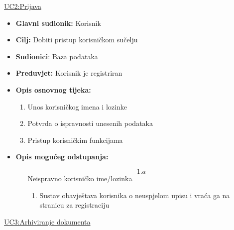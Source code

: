 \documentclass{article} %
\begin{document}
\noindent\underline{UC2:Prijava}

\begin{itemize}
	\item \textbf{Glavni sudionik:} Korisnik
	
	
	\item \textbf{Cilj:} Dobiti pristup korisničkom sučelju
	
	
	\item \textbf{Sudionici}: Baza podataka
	
	\item \textbf{Preduvjet:} Korisnik je registriran
	
	
	\item \textbf{Opis osnovnog tijeka:} 
	\begin{enumerate}
		\item Unos korisničkog imena i lozinke
		
		
		\item Potvrda o ispravnosti unesenih podataka
		
		
		\item Pristup korisničkim funkcijama
		
	\end{enumerate}
	\item \textbf{Opis mogućeg odstupanja:}
	
	\begin{enumerate}
		\item[$$1.a$$] Neispravno korisničko ime/lozinka
		
		\begin{enumerate}[label=\arabic*.]
			\item Sustav obavještava korisnika o neuspjelom upisu i vraća ga na stranicu za registraciju
			
		\end{enumerate}
	\end{enumerate}
\end{itemize}
 

\noindent\underline{UC3:Arhiviranje dokumenta}
\end{document}
